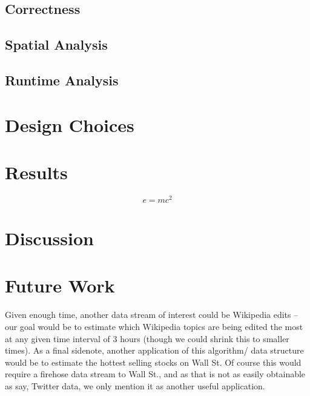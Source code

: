 \documentclass[twoside]{article}
\begin{document}
\begin{multicols}{2}
\lipsum[1]

\subsection{Correctness}

\lipsum[2-3]

\subsection{Spatial Analysis}

\lipsum[2-3]

\subsection{Runtime Analysis}

\lipsum[2-3]


\section{Design Choices}

\lipsum[1]


\section{Results}


\lipsum[5] %

\begin{equation}
\label{eq:emc}
e = mc^2
\end{equation}

\lipsum[6] %


\section{Discussion}

\lipsum[7] %

\section{Future Work} \label{sec:Future Work}

Given enough time, another data stream of interest could be Wikipedia edits -- our goal would be to estimate which Wikipedia topics are being edited the most at any given time interval of 3 hours (though we could shrink this to smaller times). As a final sidenote, another application of this algorithm/ data structure would be to estimate the hottest selling stocks on Wall St. Of course this would require a firehose data stream to Wall St., and as that is not as easily obtainable as say, Twitter data, we only mention it as another useful application.


\end{multicols}
\end{document}
